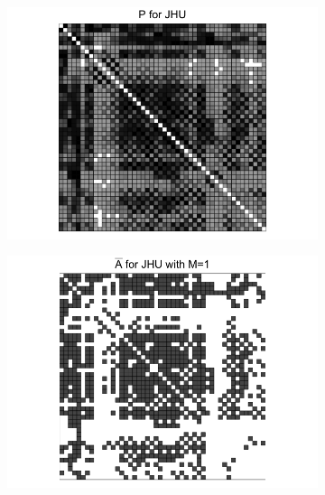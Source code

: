 \documentclass[a4paper]{article}
\begin{document}
\begin{figure}
\centering
\begin{subfigure}{.33\textwidth}
  \centering
  \includegraphics[width=1.2\linewidth]{P_JHU.png}
\end{subfigure}%
\begin{subfigure}{.33\textwidth}
  \centering
  \includegraphics[width=1.2\linewidth]{Abar_JHU_m1.png}
\end{subfigure}
\begin{subfigure}{.33\textwidth}
  \centering

\end{subfigure}
\end{figure}
\end{document}
